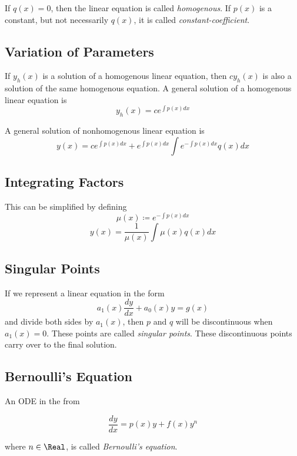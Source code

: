 If $q(x) = 0$, then the linear equation is called \textit{homogenous}. If $p(x)$ is a constant, but not necessarily $q(x)$, it is called \textit{constant-coefficient}.

\subsection{Variation of Parameters}

If $y_h(x)$ is a solution of a homogenous linear equation, then $cy_h(x)$ is also a solution of the same homogenous equation. A general solution of a homogenous linear equation is
\[
    y_h(x) = ce^{\int p(x)dx}
\]

A general solution of nonhomogenous linear equation is
\[
    y(x) = ce^{\int p(x)dx} + e^{\int p(x)dx}\int e^{-\int p(x)dx}q(x)dx
\]

\subsection{Integrating Factors}

This can be simplified by defining
\[
    \mu(x) \coloneq e^{-\int p(x)dx}
\]
\[
    y(x) = \frac{1}{\mu(x)}\int \mu(x)q(x)dx
\]

\subsection{Singular Points}

If we represent a linear equation in the form
\[
    a_1(x)\frac{dy}{dx} + a_0(x)y = g(x)
\]
and divide both sides by $a_1(x)$, then $p$ and $q$ will be discontinuous when $a_1(x) = 0$. These points are called \textit{singular points}. These discontinuous points carry over to the final solution.

\subsection{Bernoulli's Equation}

An ODE in the from

\[
    \frac{dy}{dx} = p(x)y + f(x)y^n
\]

where $n \in \Real$, is called \textit{Bernoulli's equation}.